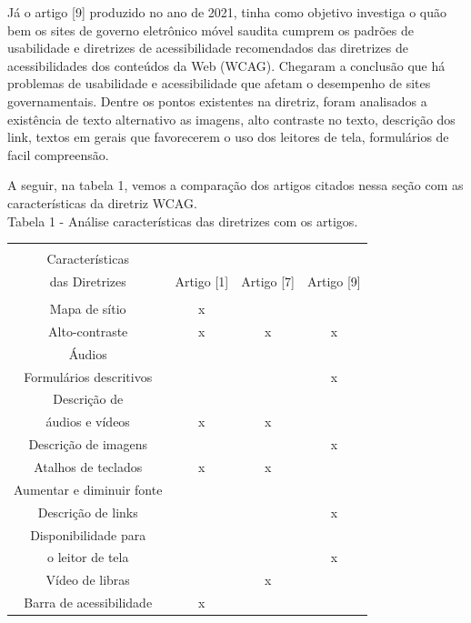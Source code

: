 \documentclass[a4paper]{article}
\begin{document}
\begin{titlepage}
Já o artigo [9] produzido no ano de 2021, tinha como objetivo investiga o quão bem os sites de governo eletrônico móvel saudita cumprem os padrões de usabilidade e diretrizes de acessibilidade recomendados das diretrizes de acessibilidades dos conteúdos da Web (WCAG). Chegaram a conclusão que há problemas de usabilidade e acessibilidade que afetam o desempenho de sites governamentais. Dentre os pontos existentes na diretriz, foram analisados a existência de texto alternativo as imagens, alto contraste no texto, descrição dos link, textos em gerais que favorecerem o uso dos leitores de tela, formulários de facil compreensão.

A seguir, na tabela 1, vemos a comparação dos artigos citados nessa seção com as características da diretriz WCAG.\\[0.5cm]

Tabela 1 - Análise características das diretrizes com os artigos.
\begin{center}
	\begin{tabular}{cccc}
		\hline \\[0.2cm]
		Características\\[0.1cm] das Diretrizes & Artigo [1] & Artigo [7] & Artigo [9]\\[0.2cm]
		\hline \\[0.2cm]
		Mapa de sítio & x & & \\[0.2cm]
		Alto-contraste & x & x & x\\[0.2cm]
		Áudios & & &  \\[0.2cm]
		Formulários descritivos & & & x \\[0.2cm]
		Descrição de\\áudios e vídeos & x & x & \\[0.2cm]
		Descrição de imagens & & & x \\[0.2cm]
		Atalhos de teclados & x & x & \\[0.2cm]
		Aumentar e diminuir fonte & & & \\[0.2cm]
		Descrição de links & & & x \\[0.2cm]
		Disponibilidade para\\o leitor de tela & & & x \\[0.2cm]
		Vídeo de libras & & x & \\[0.2cm]
		Barra de acessibilidade & x & & \\[0.2cm]
		\hline
	\end{tabular}
\end{center}


\end{titlepage}
\end{document}
